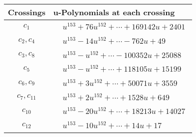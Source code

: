 \documentclass[1p]{elsarticle_modified}
\theoremstyle{definition}
\begin{document}
\begin{tabular}{m{50pt}|m{274pt}}
Crossings & \hspace{64pt}u-Polynomials at each crossing \\
\hline $$\begin{aligned}c_{1}\end{aligned}$$&$\begin{aligned}
&u^{153}+76 u^{152}+\cdots+169142 u+2401
\end{aligned}$\\
\hline $$\begin{aligned}c_{2},c_{4}\end{aligned}$$&$\begin{aligned}
&u^{153}-14 u^{152}+\cdots-762 u+49
\end{aligned}$\\
\hline $$\begin{aligned}c_{3},c_{8}\end{aligned}$$&$\begin{aligned}
&u^{153}- u^{152}+\cdots-100352 u+25088
\end{aligned}$\\
\hline $$\begin{aligned}c_{5}\end{aligned}$$&$\begin{aligned}
&u^{153}- u^{152}+\cdots+118105 u+15199
\end{aligned}$\\
\hline $$\begin{aligned}c_{6},c_{9}\end{aligned}$$&$\begin{aligned}
&u^{153}+3 u^{152}+\cdots+50071 u+3559
\end{aligned}$\\
\hline $$\begin{aligned}c_{7},c_{11}\end{aligned}$$&$\begin{aligned}
&u^{153}+2 u^{152}+\cdots+1528 u+649
\end{aligned}$\\
\hline $$\begin{aligned}c_{10}\end{aligned}$$&$\begin{aligned}
&u^{153}-20 u^{152}+\cdots+18213 u+14027
\end{aligned}$\\
\hline $$\begin{aligned}c_{12}\end{aligned}$$&$\begin{aligned}
&u^{153}-10 u^{152}+\cdots+14 u+17
\end{aligned}$\\
\hline
\end{tabular}\\~\\
\end{document}
